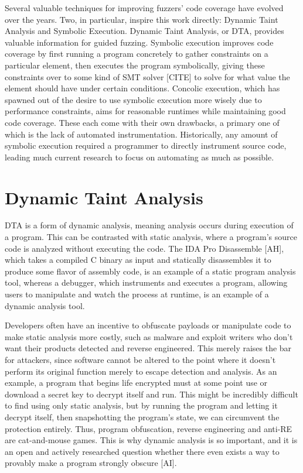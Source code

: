 \documentclass[11pt,expanded,copyright]{fsuthesis}
\begin{document}
Several valuable techniques for improving fuzzers' code coverage have evolved over the years. Two, in particular, inspire this work directly: Dynamic Taint Analysis and Symbolic Execution. Dynamic Taint Analysis, or DTA, provides valuable information for guided fuzzing. Symbolic execution improves code coverage by first running a program concretely to gather constraints on a particular element, then executes the program symbolically, giving these constraints over to some kind of SMT solver [CITE] to solve for what value the element should have under certain conditions. Concolic execution, which has spawned out of the desire to use symbolic execution more wisely due to performance constraints, aims for reasonable runtimes while maintaining good code coverage. These each come with their own drawbacks, a primary one of which is the lack of automated instrumentation. Historically, any amount of symbolic execution required a programmer to directly instrument source code, leading much current research to focus on automating as much as possible.

\section{Dynamic Taint Analysis}

DTA is a form of dynamic analysis, meaning analysis occurs during execution of a program. This can be contrasted with static analysis, where a program's source code is analyzed without executing the code. The IDA Pro Disassemble [AH], which takes a compiled C binary as input and statically disassembles it to produce some flavor of assembly code, is an example of a static program analysis tool, whereas a debugger, which instruments and executes a program, allowing users to manipulate and watch the process at runtime, is an example of a dynamic analysis tool.

Developers often have an incentive to obfuscate payloads or manipulate code to make static analysis more costly, such as malware and exploit writers who don't want their products detected and reverse engineered. This merely raises the bar for attackers, since software cannot be altered to the point where it doesn't perform its original function merely to escape detection and analysis. As an example, a program that begins life encrypted must at some point use or download a secret key to decrypt itself and run. This might be incredibly difficult to find using only static analysis, but by running the program and letting it decrypt itself, then snapshotting the program's state, we can circumvent the protection entirely. Thus, program obfuscation, reverse engineering and anti-RE are cat-and-mouse games.  This is why dynamic analysis is so important, and it is an open and actively researched question whether there even exists a way to provably make a program strongly obscure [AI].
\end{document}
